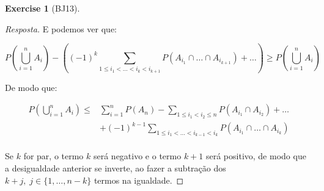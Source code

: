 \documentclass[
]{article}
\theoremstyle{definition}
\theoremstyle{definition}
\theoremstyle{definition}
\newtheorem{exercise}{Exercise}[section]
\theoremstyle{definition}
\theoremstyle{remark}
\begin{document}
\begin{exercise}[BJ13]
\begin{proof}[Resposta]
E podemos ver que:

\begin{equation*}
P\left(\bigcup_{i=1}^{n} A_{i}\right) - \left((-1)^{k} \sum_{1 \le i_{1} < \dots < i_{k} < i_{k+1}}P(A_{i_{1}} \cap \dots \cap A_{i_{k+1}}) + \dots \right) \ge P\left(\bigcup_{i=1}^{n} A_{i}\right)
\end{equation*}

De modo que:

\begin{align*}
P\left(\bigcup_{i=1}^{n} A_{i}\right) \le &\sum_{i=1}^{n}P(A_{n}) - \sum_{1 \le i_{1} < i_{2} \le n}P(A_{i_{1}} \cap A_{i_{2}}) + \dots \\
&+ (-1)^{k-1} \sum_{1 \le i_{1} < \dots < i_{k-1} < i_{k}}P(A_{i_{1}} \cap \dots \cap A_{i_{k}}) \\
\end{align*}

Se \(k\) for par, o termo \(k\) será negativo e o termo \(k+1\) será positivo, de modo que a desigualdade anterior se inverte, ao fazer a subtração dos \(k+j,\; j \in \{1,\dots , n-k\}\) termos na igualdade.
\end{proof}

\end{exercise}
\end{document}
